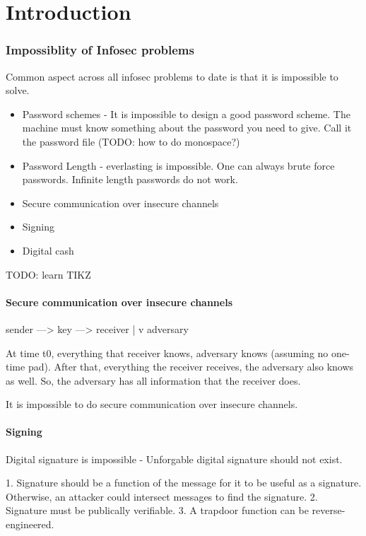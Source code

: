 \chapter{Introduction}

\subsection{Impossiblity of Infosec problems}
Common aspect across all infosec problems to date is that it is
impossible to solve.
\begin{itemize}
    \item Password schemes - It is impossible to design a good password scheme.
          The machine must know something about the password you need to give.
          Call it the password file (TODO: how to do monospace?)
    \item Password Length - everlasting is impossible. One can always brute
        force passwords. Infinite length passwords do not work.
    \item  Secure communication over insecure channels
    \item Signing
    \item  Digital cash
\end{itemize}

TODO: learn TIKZ


\subsubsection{Secure communication over insecure channels}
\begin{listing}
sender ---> key ---> receiver
            |
            v
            adversary
\end{listing}

At time t0, everything that receiver knows, adversary knows (assuming no
one-time pad). After that, everything the receiver receives, the adversary
also knows as well. So, the adversary has all information that the receiver
does.

It is impossible to do secure communication over insecure channels.

\subsubsection{Signing}
Digital signature is impossible - Unforgable digital signature should not exist.


1. Signature should be a function of the message for it to be useful as a signature.
   Otherwise, an attacker could intersect messages to find the signature.
2. Signature must be publically verifiable.
3. A trapdoor function can be reverse-engineered.


